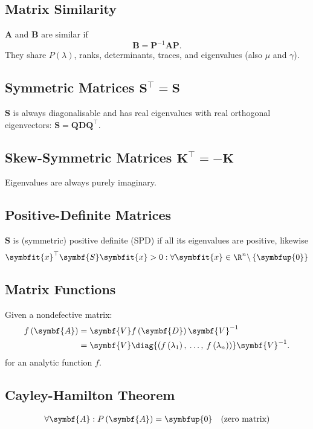 \documentclass{article}
\begin{document}
\begin{multicols*}{3}
    \subsection{Matrix Similarity}
    \(\symbf{A}\) and \(\symbf{B}\) are similar if
    \begin{equation*}
        \symbf{B} = \symbf{P}^{-1} \symbf{A} \symbf{P}.
    \end{equation*}
    They share \(P(\lambda)\), ranks, determinants, traces, and eigenvalues (also \(\mu\) and \(\gamma\)).
    \subsection{Symmetric Matrices \texorpdfstring{\(\symbf{S}^\top = \symbf{S}\)}{S' = S}}
    \(\symbf{S}\) is always diagonalisable and has
    real eigenvalues with real orthogonal eigenvectors: \(\symbf{S} = \symbf{Q} \symbf{D} \symbf{Q}^\top\).
    \subsection{Skew-Symmetric Matrices \texorpdfstring{\(\symbf{K}^\top = -\symbf{K}\)}{K' = -K}}
    Eigenvalues are always purely imaginary.
    \subsection{Positive-Definite Matrices}
    \(\symbf{S}\) is (symmetric) positive definite (SPD) if all its eigenvalues are positive, likewise
    \begin{equation*}
        \symbfit{x}^\top \symbf{S} \symbfit{x} > 0 : \forall \symbfit{x} \in \R^n \backslash \left\{ \symbfup{0} \right\}
    \end{equation*}
    \subsection{Matrix Functions}
    Given a nondefective matrix:
    \begin{align*}
        f\left( \symbf{A} \right) & = \symbf{V} f\left( \symbf{D} \right) \symbf{V}^{-1}                                                               \\
                                  & = \symbf{V} \diag{\left( f\left( \lambda_1 \right),\: \ldots,\: f\left( \lambda_n \right) \right)} \symbf{V}^{-1}.
    \end{align*}
    for an analytic function \(f\).
    \subsection{Cayley-Hamilton Theorem}
    \begin{align*}
        \forall \symbf{A} : P\left( \symbf{A} \right) = \symbfup{0} &  & \text{(zero matrix)}
    \end{align*}

\end{multicols*}
\end{document}
